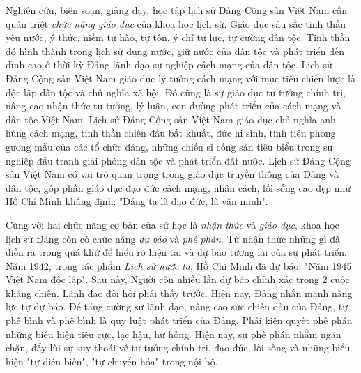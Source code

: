 Nghiên cứu, biên soạn, giảng dạy, học tập lịch sử Đảng Cộng sản Việt Nam cần quán triệt \textit{chức năng giáo dục} của khoa học lịch sử. Giáo dục sâu sắc tinh thần yêu nước, ý thức, niềm tự hào, tự tôn, ý chí tự lực, tự cường dân tộc. Tinh thần đó hình thành trong lịch sử dụng nước, giữ nước của dân tộc và phát triển đến đỉnh cao ở thời kỳ Đảng lãnh đạo sự nghiệp cách mạng của dân tộc. Lịch sử Đảng Cộng sản Việt Nam giáo dục lý tưởng cách mạng với mục tiêu chiến lược là độc lập dân tộc và chủ nghĩa xã hội. Đó cũng là sự giáo dục tư tưởng chính trị, nâng cao nhận thức tư tưởng, lý luận, con đường phát triển của cách mạng và dân tộc Việt Nam. Lịch sử Đảng Cộng sản Việt Nam giáo dục chủ nghĩa anh hùng cách mạng, tinh thần chiến đấu bất khuất, đức hi sinh, tính tiên phong gương mẫu của các tổ chức đảng, những chiến sĩ cống sản tiêu biểu trong sự nghiệp đấu tranh giải phóng dân tộc và phát triển đất nước. Lịch sử Đảng Cộng sản Việt Nam có vai trò quan trọng trong giáo dục truyền thống của Đảng và dân tộc, góp phần giáo dục đạo đức cách mạng, nhân cách, lối sống cao đẹp như Hồ Chí Minh khẳng định: "Đảng ta là đạo đức, là văn minh".

Cùng với hai chức năng cơ bản của sử học là \textit{nhận thức} và \textit{giáo dục}, khoa học lịch sử Đảng còn có chức năng \textit{dự báo} và \textit{phê phán}. Từ nhận thức những gì đã diễn ra trong quá khứ để hiểu rõ hiện tại và dự báo tương lai của sự phát triển. Năm 1942, trong tác phẩm \textit{Lịch sử nước ta}, Hồ Chí Minh đã dự báo: "Năm 1945 Việt Nam độc lập". Sau này, Người còn nhiều lần dự báo chính xác trong 2 cuộc kháng chiến. Lãnh đạo đòi hỏi phải thấy trước. Hiện nay, Đảng nhấn mạnh năng lực tự dự báo. Để tăng cường sự lãnh đạo, nâng cao sức chiến đấu của Đảng, tự phê bình và phê bình là quy luật phát triển của Đảng. Phải kiên quyết phê phán những biểu hiện tiêu cực, lạc hậu, hư hỏng. Hiện nay, sự phê phán nhằm ngăn chặn, đẩy lùi sự suy thoái về tư tưởng chính trị, đạo đức, lối sống và những biểu hiện "tự diễn biến", "tự chuyển hóa" trong nội bộ.

